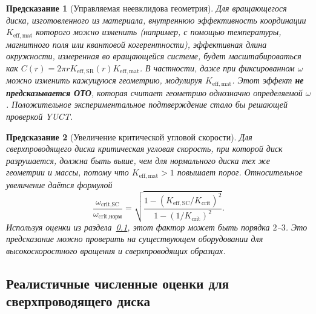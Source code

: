 \documentclass[12pt,a4paper]{article}
\newtheorem{prediction}{Предсказание}[section]
\begin{document}
	\begin{prediction}[Управляемая неевклидова геометрия]
		Для вращающегося диска, изготовленного из материала, внутреннюю эффективность координации \(K_{\mathrm{eff,mat}}\) которого можно изменить (например, с помощью температуры, магнитного поля или квантовой когерентности), эффективная длина окружности, измеренная во вращающейся системе, будет масштабироваться как \(C(r) = 2\pi r K_{\mathrm{eff,SR}}(r) K_{\mathrm{eff,mat}}\). В частности, даже при фиксированном \(\omega\) можно изменить кажущуюся геометрию, модулируя \(K_{\mathrm{eff,mat}}\). Этот эффект \textbf{не предсказывается ОТО}, которая считает геометрию однозначно определяемой \(\omega\). Положительное экспериментальное подтверждение стало бы решающей проверкой YUCT.
	\end{prediction}
	
	\begin{prediction}[Увеличение критической угловой скорости]
		Для сверхпроводящего диска критическая угловая скорость, при которой диск разрушается, должна быть выше, чем для нормального диска тех же геометрии и массы, потому что \(K_{\mathrm{eff,mat}} > 1\) повышает порог. Относительное увеличение даётся формулой
		\[
		\frac{\omega_{\text{crit,SC}}}{\omega_{\text{crit,норм}}} = \sqrt{ \frac{1 - (K_{\mathrm{eff,SC}}/K_{\mathrm{crit}})^2}{1 - (1/K_{\mathrm{crit}})^2} }.
		\]
		Используя оценки из раздела~\ref{subsec:numerical}, этот фактор может быть порядка \(2\)–\(3\). Это предсказание можно проверить на существующем оборудовании для высокоскоростного вращения и сверхпроводящих образцах.
	\end{prediction}
	
	\subsection{Реалистичные численные оценки для сверхпроводящего диска}
	\label{subsec:numerical}
	
\end{document}
